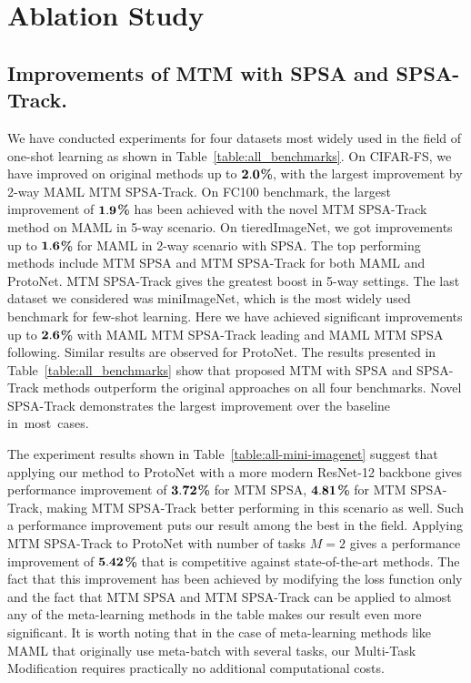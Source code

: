 \documentclass{article}
\begin{document}
\section{Ablation Study}

\subsection{Improvements of MTM with SPSA and SPSA-Track.} 

We have conducted experiments for four datasets most widely used in the field of one-shot learning as shown in Table~\ref{table:all_benchmarks}. On CIFAR-FS, we have improved on original methods up to ${\bf 2.0}${\bf \%}, with the largest improvement by 2-way MAML MTM SPSA-Track. On FC100 benchmark, the largest improvement of $\bf{1.9}${\bf \%} has been achieved with the novel MTM SPSA-Track method on MAML in 5-way scenario. On tieredImageNet, we got improvements up to $\bf{1.6}${\bf \%} for MAML in 2-way scenario with SPSA. The top performing methods include MTM SPSA and MTM SPSA-Track for both MAML and ProtoNet. MTM SPSA-Track gives the greatest boost in 5-way settings. The last dataset we considered was miniImageNet, which is the most widely used benchmark for few-shot learning. Here we have achieved significant improvements up to $\bf{2.6}${\bf \%} with MAML MTM SPSA-Track leading and MAML MTM SPSA following. Similar results are observed for ProtoNet. The results presented in Table~\ref{table:all_benchmarks} show that proposed MTM with SPSA and SPSA-Track methods outperform the original approaches on all four benchmarks. Novel SPSA-Track demonstrates the largest improvement over the baseline in~most~cases.

The experiment results shown in Table~\ref{table:all-mini-imagenet} suggest that applying our method to ProtoNet with a more modern ResNet-12 backbone gives performance improvement of $\bf{3.72}${\bf \%} for MTM SPSA, $\bf{4.81}${\bf \%} for MTM SPSA-Track, making MTM SPSA-Track better performing in this scenario as well. Such a performance improvement puts our result among the best in the field. Applying MTM SPSA-Track to ProtoNet with number of tasks $M=2$ gives a performance improvement of $\bf{5.42}${\bf \%} that is competitive against state-of-the-art methods. The fact that this improvement has been achieved by modifying the loss function only and the fact that MTM SPSA and MTM SPSA-Track can be applied to almost any of the meta-learning methods in the table makes our result even more significant. It is worth noting that in the case of meta-learning methods like MAML that originally use meta-batch with several tasks, our Multi-Task Modification requires practically no additional computational costs.
\end{document}
